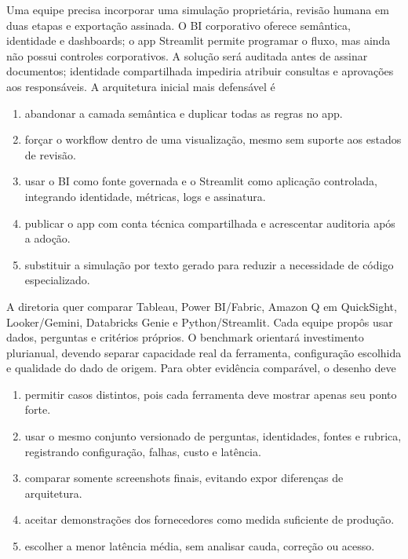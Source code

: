 \TextoBase
Uma equipe precisa incorporar uma simulação proprietária, revisão humana em duas etapas e exportação assinada. O BI corporativo oferece semântica, identidade e dashboards; o app Streamlit permite programar o fluxo, mas ainda não possui controles corporativos.
A solução será auditada antes de assinar documentos; identidade compartilhada impediria atribuir consultas e aprovações aos responsáveis.
\FonteDidatica
\Comando A arquitetura inicial mais defensável é
\begin{enumerate}[label=\Alph*)]
\item abandonar a camada semântica e duplicar todas as regras no app.
\item forçar o workflow dentro de uma visualização, mesmo sem suporte aos estados de revisão.
\item usar o BI como fonte governada e o Streamlit como aplicação controlada, integrando identidade, métricas, logs e assinatura.
\item publicar o app com conta técnica compartilhada e acrescentar auditoria após a adoção.
\item substituir a simulação por texto gerado para reduzir a necessidade de código especializado.
\end{enumerate}

\TextoBase
A diretoria quer comparar Tableau, Power BI/Fabric, Amazon Q em QuickSight, Looker/Gemini, Databricks Genie e Python/Streamlit. Cada equipe propôs usar dados, perguntas e critérios próprios.
O benchmark orientará investimento plurianual, devendo separar capacidade real da ferramenta, configuração escolhida e qualidade do dado de origem.
\FonteDidatica
\Comando Para obter evidência comparável, o desenho deve
\begin{enumerate}[label=\Alph*)]
\item permitir casos distintos, pois cada ferramenta deve mostrar apenas seu ponto forte.
\item usar o mesmo conjunto versionado de perguntas, identidades, fontes e rubrica, registrando configuração, falhas, custo e latência.
\item comparar somente screenshots finais, evitando expor diferenças de arquitetura.
\item aceitar demonstrações dos fornecedores como medida suficiente de produção.
\item escolher a menor latência média, sem analisar cauda, correção ou acesso.
\end{enumerate}

